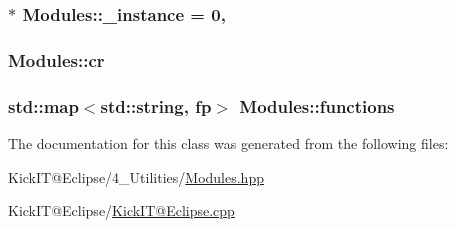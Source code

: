 \subsubsection[{\texorpdfstring{\+\_\+instance}{_instance}}]{ $\ast$ Modules\+::\+\_\+instance = 0\hspace{0.3cm}{\ttfamily [static]}, {\ttfamily [protected]}}\hypertarget{class_modules_ad82835853c834bfec3aa53da4b75def4}{}\label{class_modules_ad82835853c834bfec3aa53da4b75def4}
\subsubsection[{\texorpdfstring{cr}{cr}}]{ Modules\+::cr\hspace{0.3cm}{\ttfamily [protected]}}\hypertarget{class_modules_a26598b42bad97f63a6662078afb61af4}{}\label{class_modules_a26598b42bad97f63a6662078afb61af4}
\subsubsection[{\texorpdfstring{functions}{functions}}]{\setlength{\rightskip}{0pt plus 5cm}std\+::map$<$std\+::string, {\bf fp}$>$ Modules\+::functions\hspace{0.3cm}{\ttfamily [protected]}}\hypertarget{class_modules_a96b175e7cd625d536d12f9c5e4aa8318}{}\label{class_modules_a96b175e7cd625d536d12f9c5e4aa8318}


The documentation for this class was generated from the following files\+:\begin{DoxyCompactItemize}
\item 
Kick\+I\+T@\+Eclipse/4\+\_\+\+Utilities/\hyperlink{_modules_8hpp}{Modules.\+hpp}\item 
Kick\+I\+T@\+Eclipse/\hyperlink{_kick_i_t_0D_eclipse_8cpp}{Kick\+I\+T@\+Eclipse.\+cpp}\end{DoxyCompactItemize}
